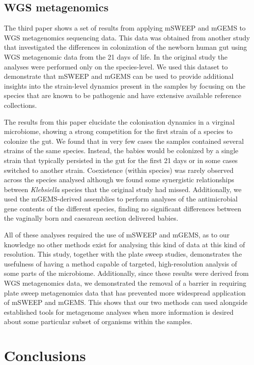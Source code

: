 \documentclass[officiallayout]{tktla}
\begin{document}
\subsection{WGS metagenomics}

The third paper shows a set of results from applying mSWEEP and mGEMS
to WGS metagenomics sequencing data. This data was obtained from
another study that investigated the differences in colonization of the
newborn human gut using WGS metagenomic data from the 21 days of
life. In the original study the analyses were performed only on the
species-level. We used this dataset to demonstrate that mSWEEP and
mGEMS can be used to provide additional insights into the strain-level
dynamics present in the samples by focusing on the species that are
known to be pathogenic and have extensive available reference
collections.

The results from this paper elucidate the colonisation dynamics in a
virginal microbiome, showing a strong competition for the first strain
of a species to colonize the gut. We found that in very few cases the
samples contained several strains of the same species. Instead, the
babies would be colonized by a single strain that typically persisted
in the gut for the first 21 days or in some cases switched to another
strain. Coexistence (within species) was rarely observed across the
species analysed although we found some synergistic relationships
between \textit{Klebsiella} species that the original study had
missed. Additionally, we used the mGEMS-derived assemblies to perform
analyses of the antimicrobial gene contents of the different species,
finding no significant differences between the vaginally born and
caesarean section delivered babies.


All of these analyses required the use of mSWEEP and mGEMS, as to our
knowledge no other methods exist for analysing this kind of data at
this kind of resolution. This study, together with the plate sweep
studies, demonstrates the usefulness of having a method capable of
targeted, high-resolution analysis of some parts of the
microbiome. Additionally, since these results were derived from WGS
metagenomics data, we demonstrated the removal of a barrier in
requiring plate sweep metagenomics data that has prevented more
widespread application of mSWEEP and mGEMS. This shows that our two
methods can used alongside established tools for metagenome analyses
when more information is desired about some particular subset of
organisms within the samples.

\section{Conclusions}
\end{document}
